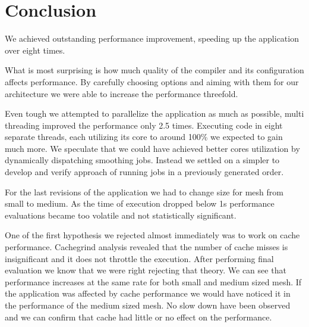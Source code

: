 \documentclass[conference]{IEEEtran}
\begin{document}
\section{Conclusion}
We achieved outstanding performance improvement, speeding up the application over eight times. 

What is most surprising is how much quality of the compiler and its configuration affects performance. By carefully choosing options and aiming with them for our architecture we were able to increase the performance threefold.

Even tough we attempted to parallelize the application as much as possible, multi threading improved the performance only 2.5 times. Executing code in eight separate threads, each utilizing its core to around 100\% we expected to gain much more. We speculate that we could have achieved better cores utilization by dynamically dispatching smoothing jobs. Instead we settled on a simpler to develop and verify approach of running jobs in a previously generated order.

For the last revisions of the application we had to change size for mesh from small to medium. As the time of execution dropped below 1s performance evaluations became too volatile and not statistically significant.


One of the first hypothesis we rejected almost immediately was to work on cache performance. Cachegrind analysis revealed that the number of cache misses is insignificant and it does not throttle the execution. After performing final evaluation we know that we were right rejecting that theory. We can see that performance increases at the same rate for both small and medium sized mesh. If the application was affected by cache performance we would have noticed it in the performance of the medium sized mesh. No slow down have been observed and we can confirm that cache had little or no effect on the performance.
\end{document}
